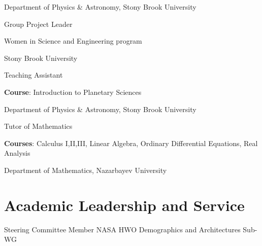 \documentclass[10pt]{article} %
\begin{document}
\begin{paracol}{1}
{	Department of Physics \& Astronomy, Stony Brook University}

	{Group Project Leader}
	{ Women in Science and Engineering program
	
	Stony Brook University}
	
	{Teaching Assistant}
	{\textbf{Course}: Introduction to Planetary Sciences
	
	Department of Physics \& Astronomy, Stony Brook University}
	
	
	{Tutor of Mathematics}
	{\textbf{Courses}: Calculus I,II,III, Linear Algebra, Ordinary Differential Equations, Real Analysis
	
	Department of Mathematics, Nazarbayev University}

	

\section{Academic Leadership and Service}





	
	{Steering Committee Member}
	{NASA HWO Demographics and Architectures Sub-WG}


\end{paracol}
\end{document}
